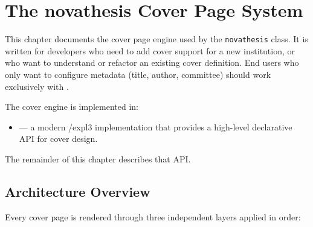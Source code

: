 

%

\chapter{The \texorpdfstring{\textbf{nova}thesis}{novathesis} Cover Page System}
\label{app:covers}

This chapter documents the cover page engine used by the \texttt{novathesis}
class.  It is written for developers who need to add cover support for a new
institution, or who want to understand or refactor an existing cover
definition.  End users who only want to configure metadata (title, author,
committee) should work exclusively with .

The cover engine is implemented in:
\begin{itemize}
  \item {} — a modern
        /expl3 implementation that provides a high-level
        declarative \gls{API} for cover design.
\end{itemize}
The remainder of this chapter describes that \gls{API}.


\section{Architecture Overview}
\label{sec:covers_arch}

Every cover page is rendered through three independent layers applied in
order:

